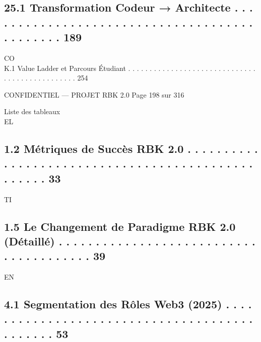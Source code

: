 \subsection{25.1 Transformation Codeur → Architecte . . . . . . . . . . . . . . . . . . . . . . . . . . . . . . . . . . . . . . . . . . . . . 189}
CO\\
K.1 Value Ladder et Parcours Étudiant . . . . . . . . . . . . . . . . . . . . . . . . . . . . . . . . . . . . . . . . . . . . . . . 254\\
\vspace{0.5em}
\vspace{0.5em}
\vspace{0.5em}
\vspace{0.5em}
\begin{confidential}CONFIDENTIEL — PROJET RBK 2.0                                Page 198 sur 316\end{confidential}
Liste des tableaux\\
\vspace{0.5em}
\vspace{0.5em}
\vspace{0.5em}
\vspace{0.5em}
EL\\
\subsection{1.2 Métriques de Succès RBK 2.0 . . . . . . . . . . . . . . . . . . . . . . . . . . . . . . . . . . . . . . . . . . . . . . . . . .     33}
\vspace{0.5em}
\vspace{0.5em}
\vspace{0.5em}
\vspace{0.5em}
TI\\
\subsection{1.5 Le Changement de Paradigme RBK 2.0 (Détaillé) . . . . . . . . . . . . . . . . . . . . . . . . . . . . . . . . . . . . . . .         39}
\vspace{0.5em}
\vspace{0.5em}
\vspace{0.5em}
\vspace{0.5em}
EN\\
\subsection{4.1 Segmentation des Rôles Web3 (2025) . . . . . . . . . . . . . . . . . . . . . . . . . . . . . . . . . . . . . . . . . . . . .        53}
